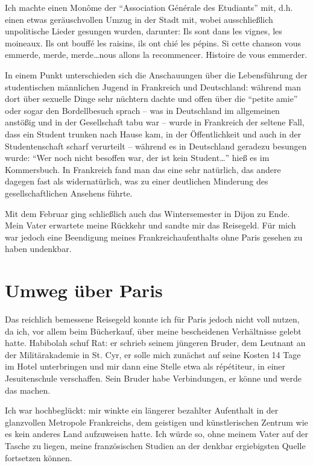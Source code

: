 \documentclass[a5paper,pagesize,10pt,twoside=true]{scrbook}
\begin{document}
Ich machte einen Monôme der \enquote{Association Générale des Etudiants} mit, d.h. einen etwas geräuschvollen Umzug in der Stadt mit, wobei ausschließlich unpolitische Lieder gesungen wurden, darunter: Ils sont dans les vignes, les moineaux. Ils ont bouffé les raisins, ils ont chié les pépins. Si cette chanson vous emmerde, merde, merde\dots nous allons la recommencer. Histoire de vous emmerder.

In einem Punkt unterschieden sich die Anschauungen über die Lebensführung der studentischen männlichen Jugend in Frankreich und Deutschland: während man dort über sexuelle Dinge sehr nüchtern dachte und offen über die \enquote{petite amie} oder sogar den Bordellbesuch sprach -- was in Deutschland im allgemeinen anstößig und in der Gesellschaft tabu war -- wurde in Frankreich der seltene Fall, dass ein Student trunken nach Hause kam, in der Öffentlichkeit und auch in der Studentenschaft scharf verurteilt -- während es in Deutschland geradezu besungen wurde: \enquote{Wer noch nicht besoffen war, der ist kein Student\dots} hieß es im Kommersbuch. In Frankreich fand man das eine sehr natürlich, das andere dagegen fast als widernatürlich, was zu einer deutlichen Minderung des gesellschaftlichen Ansehens führte.

Mit dem Februar ging schließlich auch das Wintersemester in Dijon zu Ende. Mein Vater erwartete meine Rückkehr und sandte mir das Reisegeld. Für mich war jedoch eine Beendigung meines Frankreichaufenthalts ohne Paris gesehen zu haben undenkbar.


\section{Umweg über Paris}

Das reichlich bemessene Reisegeld konnte ich für Paris jedoch nicht voll nutzen, da ich, vor allem beim Bücherkauf, über meine bescheidenen Verhältnisse gelebt hatte. Habibolah schuf Rat: er schrieb seinem jüngeren Bruder, dem Leutnant an der Militärakademie in St. Cyr, er solle mich zunächst auf seine Kosten 14 Tage im Hotel unterbringen und mir dann eine Stelle etwa als répétiteur, in einer Jesuitenschule verschaffen. Sein Bruder habe Verbindungen, er könne und werde das machen.

Ich war hochbeglückt: mir winkte ein längerer bezahlter Aufenthalt in der glanzvollen Metropole Frankreichs, dem geistigen und künstlerischen Zentrum wie es kein anderes Land aufzuweisen hatte. Ich würde so, ohne meinem Vater auf der Tasche zu liegen, meine französischen Studien an der denkbar ergiebigsten Quelle fortsetzen können.
\end{document}
